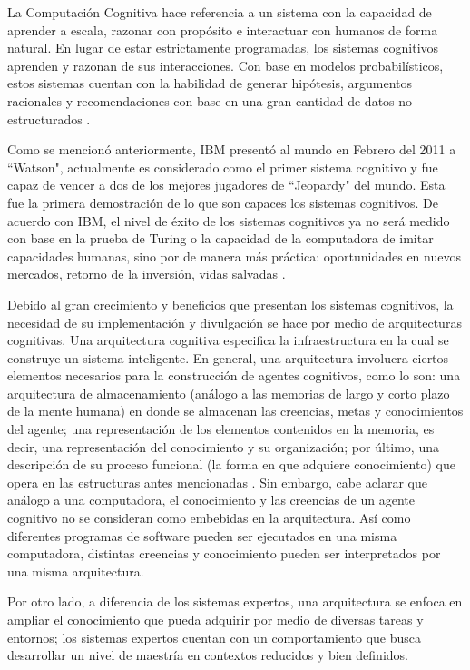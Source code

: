 La Computaci\'{o}n Cognitiva hace referencia a un sistema con la capacidad de aprender a escala, razonar con prop\'{o}sito e interactuar con humanos de forma natural. En lugar de estar estrictamente programadas, los sistemas cognitivos aprenden y razonan de sus interacciones. Con base en modelos probabil\'{i}sticos, estos sistemas cuentan con la habilidad de generar hip\'{o}tesis, argumentos racionales y recomendaciones con base en una gran cantidad de datos no estructurados \cite{ibmcc}.

Como se mencion\'{o} anteriormente, IBM present\'{o} al mundo en Febrero del 2011 a “Watson", actualmente es considerado como el primer sistema cognitivo y fue capaz de vencer a dos de los mejores jugadores de “Jeopardy" del mundo. Esta fue la primera demostraci\'{o}n de lo que son capaces los sistemas cognitivos. De acuerdo con IBM, el nivel de \'{e}xito de los sistemas cognitivos ya no ser\'{a} medido con base en la prueba de Turing o la capacidad de la computadora de imitar capacidades humanas, sino por de manera m\'{a}s pr\'{a}ctica: oportunidades en nuevos mercados, retorno de la inversi\'{o}n, vidas salvadas \cite{ibmcc}.

Debido al gran crecimiento y beneficios que presentan los sistemas cognitivos, la necesidad de su implementaci\'{o}n y divulgaci\'{o}n se hace por medio de arquitecturas cognitivas. Una arquitectura cognitiva especifica la infraestructura en la cual se construye un sistema inteligente. En general, una arquitectura involucra ciertos elementos necesarios para la construcci\'{o}n de agentes cognitivos, como lo son: una arquitectura de almacenamiento (an\'{a}logo a las memorias de largo y corto plazo de la mente humana) en donde se almacenan las creencias, metas y conocimientos del agente; una representaci\'{o}n de los elementos contenidos en la memoria, es decir, una representaci\'{o}n del conocimiento y su organizaci\'{o}n; por \'{u}ltimo, una descripci\'{o}n de su proceso funcional (la forma en que adquiere conocimiento) que opera en las estructuras antes mencionadas \cite{langley2009cognitive}. Sin embargo, cabe aclarar que an\'{a}logo a una computadora, el conocimiento y las creencias de un agente cognitivo no se consideran como embebidas en la arquitectura. As\'{i} como diferentes programas de software pueden ser ejecutados en una misma computadora, distintas creencias y conocimiento pueden ser interpretados por una misma arquitectura.

Por otro lado, a diferencia de los sistemas expertos, una arquitectura se enfoca en ampliar el conocimiento que pueda adquirir por medio de diversas tareas y entornos; los sistemas expertos cuentan con un comportamiento que busca desarrollar un nivel de maestr\'{i}a en contextos reducidos y bien definidos.


